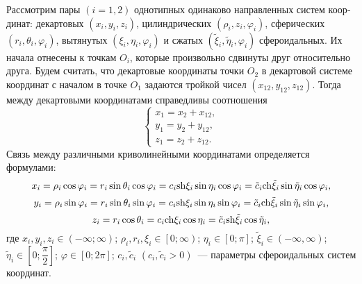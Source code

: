 \begin{russian}
Рассмотрим пары $(i = 1,2)$ однотипных одинаково направленных систем координат: декартовых $\left( {{x_i},{y_i},{z_i}} \right)$, цилиндрических $\left( {{\rho _i},{z_i},{\varphi _i}} \right)$, сферических $\left( {{r_i},{\theta _i},{\varphi _i}} \right)$, вытянутых $\left( {{\xi _i},{\eta _i},{\varphi _i}} \right)$ и сжатых $\left( {{{\tilde \xi }_i},{{\tilde \eta }_i},{\varphi _i}} \right)$ сфероидальных. Их начала отнесены к точкам ${O_i}$, которые произвольно сдвинуты друг относительно друга. Будем считать, что декартовые координаты точки ${O_2}$ в декартовой системе координат с началом в точке ${O_1}$ задаются тройкой чисел $\left( {{x_{12}},{y_{12}},{z_{12}}} \right)$. Тогда между декартовыми координатами справедливы соотношения
\begin{equation}\label{eq:1:1}
\left\{ {\begin{array}{*{20}{l}}
{{x_1} = {x_2} + {x_{12}},}\\
{{y_1} = {y_2} + {y_{12}},}\\
{{z_1} = {z_2} + {z_{12}}.}
\end{array}} \right.
\end{equation}
Связь между различными криволинейными координатами определяется формулами:
\begin{equation*}
{x_i} = {\rho _i}\cos {\varphi _i} = {r_i}\sin {\theta _i}\cos {\varphi _i} = {c_i}{\mathop{\rm sh}\nolimits} {\xi _i}\sin {\eta _i}\cos {\varphi _i} = {\tilde c_i}{\mathop{\rm ch}\nolimits} {\tilde \xi _i}\sin {\tilde \eta _i}\cos {\varphi _i},
\end{equation*}
\begin{equation*}
{y_i} = {\rho _i}\sin {\varphi _i} = {r_i}\sin {\theta _i}\sin {\varphi _i} = {c_i}{\mathop{\rm sh}\nolimits} {\xi _i}\sin {\eta _i}\sin {\varphi _i} = {\tilde c_i}{\mathop{\rm ch}\nolimits} {\tilde \xi _i}\sin {\tilde \eta _i}\sin {\varphi _i},
\end{equation*}
\begin{equation}\label{eq:1:2}
{z_i} = {r_i}\cos {\theta _i} = {c_i}{\mathop{\rm ch}\nolimits} {\xi _i}\cos {\eta _i} = {\tilde c_i}{\mathop{\rm sh}\nolimits} {\tilde \xi _i}\cos {\tilde \eta _i},
\end{equation}
\noindent где ${x_i},{y_i},{z_i} \in \left( { - \infty ;\infty } \right)$; ${\rho _i},{r_i},{\xi _i} \in \left[ {\left. {0;\infty } \right)} \right.$; ${\eta _i} \in \left[ {0;\pi } \right]$; ${\tilde \xi _i} \in \left( { - \infty ,\infty } \right)$; ${\tilde \eta _i} \in \left[ {0;\dfrac{\pi }{2}} \right]$; $\varphi  \in \left[ {0;2\pi } \right]$; ${c_i},{\tilde c_i}$ $\left( {{c_i},{{\tilde c}_i} > 0} \right)$~--- параметры сфероидальных систем координат.


\end{russian}
